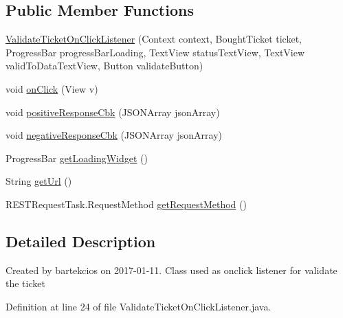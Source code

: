 \subsection*{Public Member Functions}
\begin{DoxyCompactItemize}
\item 
\hyperlink{classcom_1_1bartekcios_1_1ticketsclient_1_1_validate_ticket_on_click_listener_afe32ec3297aefb0642d990ea96d59fcc}{Validate\+Ticket\+On\+Click\+Listener} (Context context, Bought\+Ticket ticket, Progress\+Bar progress\+Bar\+Loading, Text\+View status\+Text\+View, Text\+View valid\+To\+Data\+Text\+View, Button validate\+Button)
\item 
void \hyperlink{classcom_1_1bartekcios_1_1ticketsclient_1_1_validate_ticket_on_click_listener_af983654a9fa3a28d953f072f9fb224ca}{on\+Click} (View v)
\item 
void \hyperlink{classcom_1_1bartekcios_1_1ticketsclient_1_1_validate_ticket_on_click_listener_a2fdd057515d2e8d99d1e1cb5a5307110}{positive\+Response\+Cbk} (J\+S\+O\+N\+Array json\+Array)
\item 
void \hyperlink{classcom_1_1bartekcios_1_1ticketsclient_1_1_validate_ticket_on_click_listener_a8991671fb5d7cabb5dcf4e9c162bbf2e}{negative\+Response\+Cbk} (J\+S\+O\+N\+Array json\+Array)
\item 
Progress\+Bar \hyperlink{classcom_1_1bartekcios_1_1ticketsclient_1_1_validate_ticket_on_click_listener_a128c705950b8ebeb7f257a25646c681e}{get\+Loading\+Widget} ()
\item 
String \hyperlink{classcom_1_1bartekcios_1_1ticketsclient_1_1_validate_ticket_on_click_listener_a4e7ec5237a45c0af64a98fd128a08c8a}{get\+Url} ()
\item 
R\+E\+S\+T\+Request\+Task.\+Request\+Method \hyperlink{classcom_1_1bartekcios_1_1ticketsclient_1_1_validate_ticket_on_click_listener_a67d2d6a7e9b8cb270fb68947bc11cc2f}{get\+Request\+Method} ()
\end{DoxyCompactItemize}


\subsection{Detailed Description}
Created by bartekcios on 2017-\/01-\/11. Class used as onclick listener for validate the ticket 

Definition at line 24 of file Validate\+Ticket\+On\+Click\+Listener.\+java.



